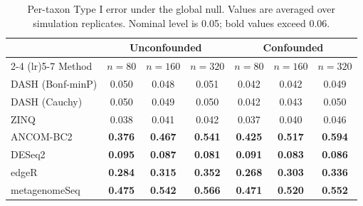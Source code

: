 \begin{table}[t]
\centering
\caption{Per-taxon Type I error under the global null. Values are averaged over simulation replicates. Nominal level is 0.05; bold values exceed 0.06.}
\label{tab:typeI_sparsedossa2}
\begin{tabular}{lcccccc}
\toprule
 & \multicolumn{3}{c}{Unconfounded} & \multicolumn{3}{c}{Confounded} \\
\cmidrule(lr){2-4} \cmidrule(lr){5-7}
Method & $n=80$ & $n=160$ & $n=320$ & $n=80$ & $n=160$ & $n=320$ \\
\midrule
DASH (Bonf-minP) & 0.050 & 0.048 & 0.051 & 0.042 & 0.042 & 0.049 \\
DASH (Cauchy) & 0.050 & 0.049 & 0.050 & 0.042 & 0.043 & 0.050 \\
ZINQ & 0.038 & 0.041 & 0.042 & 0.037 & 0.040 & 0.046 \\
ANCOM-BC2 & \textbf{0.376} & \textbf{0.467} & \textbf{0.541} & \textbf{0.425} & \textbf{0.517} & \textbf{0.594} \\
DESeq2 & \textbf{0.095} & \textbf{0.087} & \textbf{0.081} & \textbf{0.091} & \textbf{0.083} & \textbf{0.086} \\
edgeR & \textbf{0.284} & \textbf{0.315} & \textbf{0.352} & \textbf{0.268} & \textbf{0.303} & \textbf{0.336} \\
metagenomeSeq & \textbf{0.475} & \textbf{0.542} & \textbf{0.566} & \textbf{0.471} & \textbf{0.520} & \textbf{0.552} \\
\bottomrule
\end{tabular}
\end{table}
